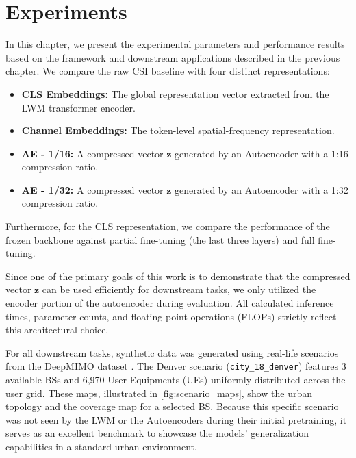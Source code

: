 \chapter{Experiments}\label{sec:experiments}

In this chapter, we present the experimental parameters and performance results based on the framework and downstream applications described in the previous chapter. We compare the raw CSI baseline with four distinct representations:

\begin{itemize}
    \item \textbf{CLS Embeddings:} The global representation vector extracted from the LWM transformer encoder.
    \item \textbf{Channel Embeddings:} The token-level spatial-frequency representation.
    \item \textbf{AE - 1/16:} A compressed vector $\mathbf{z}$ generated by an Autoencoder with a 1:16 compression ratio.
    \item \textbf{AE - 1/32:} A compressed vector $\mathbf{z}$ generated by an Autoencoder with a 1:32 compression ratio.
\end{itemize}

Furthermore, for the CLS representation, we compare the performance of the frozen backbone against partial fine-tuning (the last three layers) and full fine-tuning.

Since one of the primary goals of this work is to demonstrate that the compressed vector $\mathbf{z}$ can be used efficiently for downstream tasks, we only utilized the encoder portion of the autoencoder during evaluation. All calculated inference times, parameter counts, and floating-point operations (FLOPs) strictly reflect this architectural choice.

For all downstream tasks, synthetic data was generated using real-life scenarios from the DeepMIMO dataset \cite{Alkhateeb2019}. The Denver scenario (\texttt{city\_18\_denver}) features 3 available BSs and 6,970 User Equipments (UEs) uniformly distributed across the user grid. These maps, illustrated in \ref{fig:scenario_maps}, show the urban topology and the coverage map for a selected BS. Because this specific scenario was not seen by the LWM or the Autoencoders during their initial pretraining, it serves as an excellent benchmark to showcase the models' generalization capabilities in a standard urban environment.

